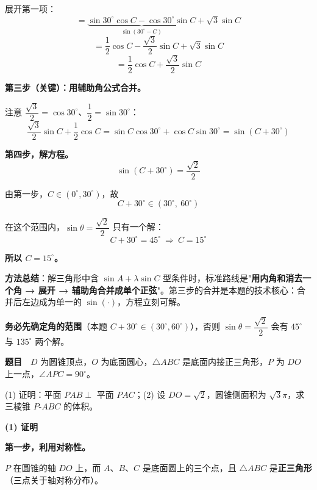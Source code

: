 展开第一项：
\[=\underbrace{\sin30^\circ\cos C-\cos30^\circ\sin C}_{\sin(30^\circ-C)}+\sqrt3\sin C\]
\[=\frac12\cos C-\frac{\sqrt3}2\sin C+\sqrt3\sin C\]
\[=\frac12\cos C+\frac{\sqrt3}2\sin C\]

\textbf{第三步（关键）：用辅助角公式合并。}

注意 $\dfrac{\sqrt3}2=\cos30^\circ$、$\dfrac12=\sin30^\circ$：
\[\frac{\sqrt3}2\sin C+\frac12\cos C=\sin C\cos30^\circ+\cos C\sin30^\circ=\sin\left(C+30^\circ\right)\]

\textbf{第四步，解方程。}
\[\sin\left(C+30^\circ\right)=\frac{\sqrt2}2\]

由第一步，$C\in\left(0^\circ,30^\circ\right)$，故
\[C+30^\circ\in\left(30^\circ,\ 60^\circ\right)\]

在这个范围内，$\sin\theta=\dfrac{\sqrt2}2$ 只有一个解：
\[C+30^\circ=45^\circ\ \Longrightarrow\ C=15^\circ\]

\textbf{所以 $C=15^\circ$。}

\begin{gktip}
\textbf{方法总结}：解三角形中含 $\sin A+\lambda\sin C$ 型条件时，标准路线是"\textbf{用内角和消去一个角 → 展开 → 辅助角合并成单个正弦}"。第三步的合并是本题的技术核心：合并后左边成为单一的 $\sin(\cdot)$，方程立刻可解。

\textbf{务必先确定角的范围}（本题 $C+30^\circ\in(30^\circ,60^\circ)$），否则 $\sin\theta=\dfrac{\sqrt2}2$ 会有 $45^\circ$ 与 $135^\circ$ 两个解。
\end{gktip}

\par\medskip


\textbf{题目}　$D$ 为圆锥顶点，$O$ 为底面圆心，$\triangle ABC$ 是底面内接正三角形，$P$ 为 $DO$ 上一点，$\angle APC=90^\circ$。

\begin{center}\end{center}

  (1) 证明：平面 $PAB\perp$ 平面 $PAC$；(2) 设 $DO=\sqrt2$，圆锥侧面积为 $\sqrt3\pi$，求三棱锥 $P\text{-}ABC$ 的体积。

\par\medskip

\textbf{(1) 证明}

\textbf{第一步，利用对称性。}

$P$ 在圆锥的轴 $DO$ 上，而 $A$、$B$、$C$ 是底面圆上的三个点，且 $\triangle ABC$ 是\textbf{正三角形}（三点关于轴对称分布）。

